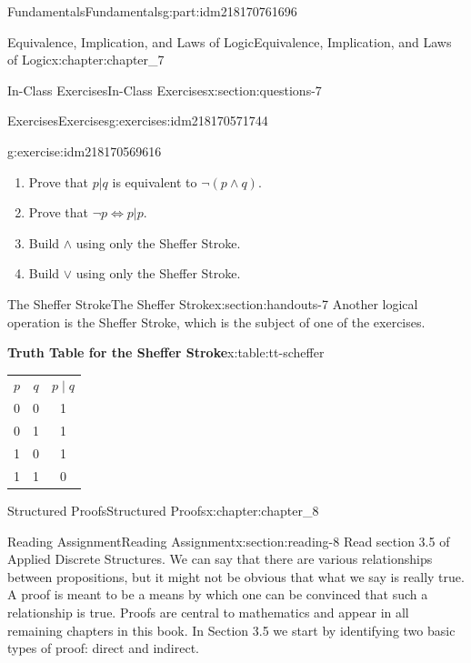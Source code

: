 \documentclass[oneside,10pt,]{book}
\newcommand{\tabularfont}{\relax}
\numberwithin{equation}{section}
\begin{document}
\begin{partptx}{Fundamentals}{}{Fundamentals}{}{}{g:part:idm218170761696}
\begin{chapterptx}{Equivalence, Implication, and Laws of Logic}{}{Equivalence, Implication, and Laws of Logic}{}{}{x:chapter:chapter_7}
\begin{sectionptx}{In-Class Exercises}{}{In-Class Exercises}{}{}{x:section:questions-7}
\begin{exercises-subsection-numberless}{Exercises}{}{Exercises}{}{}{g:exercises:idm218170571744}
\begin{exercisegroup}
\begin{divisionexerciseeg}{4}{}{}{g:exercise:idm218170569616}
\begin{enumerate}[label=(\alph*)]
\item{}Prove that \(p | q\) is equivalent to \(\neg (p \land  q)\).%
\item{}Prove that \(\neg p \Leftrightarrow  p | p\).%
\item{}Build \(\land\) using only the Sheffer Stroke.%
\item{}Build \(\lor\) using only the Sheffer Stroke.%
\end{enumerate}
%
\end{divisionexerciseeg}%
\end{exercisegroup}
\par\medskip\noindent
\end{exercises-subsection-numberless}
\end{sectionptx}
%
%
\typeout{************************************************}
\typeout{************************************************}
%
\begin{sectionptx}{The Sheffer Stroke}{}{The Sheffer Stroke}{}{}{x:section:handouts-7}
%
Another logical operation is the Sheffer Stroke, which is the subject of one of the exercises.%
\begin{tableptx}{\textbf{Truth Table for the Sheffer Stroke}}{x:table:tt-scheffer}{}%
\centering%
{\tabularfont%
\begin{tabular}{ccc}
\(p\)&\(q\)&\(p \mid q\)\tabularnewline[0pt]
0&0&1\tabularnewline[0pt]
0&1&1\tabularnewline[0pt]
1&0&1\tabularnewline[0pt]
1&1&0
\end{tabular}
}%
\end{tableptx}%
\end{sectionptx}
\end{chapterptx}
%
\typeout{************************************************}
\typeout{************************************************}
%
\begin{chapterptx}{Structured Proofs}{}{Structured Proofs}{}{}{x:chapter:chapter_8}
%
%
%
\typeout{************************************************}
\typeout{************************************************}
%
\begin{sectionptx}{Reading Assignment}{}{Reading Assignment}{}{}{x:section:reading-8}
Read section 3.5 of Applied Discrete Structures.  We can say that there are various relationships between propositions, but it might not be obvious that what we say is really true.  A proof is meant to be a means by which one can be convinced that such a relationship is true. Proofs are central to mathematics and appear in all remaining chapters in this book.  In Section 3.5 we start by identifying two basic types of proof: direct and indirect.%

\end{sectionptx}
\end{chapterptx}
\end{partptx}
\end{document}
